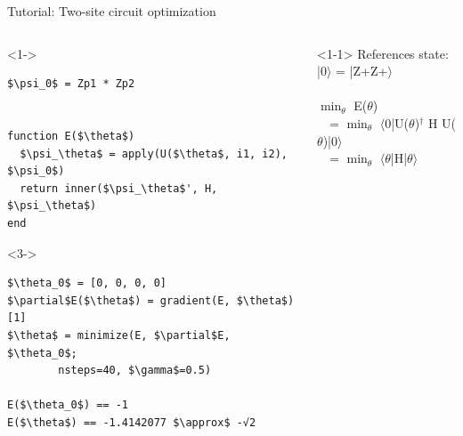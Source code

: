 \begin{frame}[fragile]{Tutorial: Two-site circuit optimization}

\begin{columns}

\begin{column}{5cm}

\begin{onlyenv}<1->
\begin{lstlisting}[language=JuliaLocal, style=julia, mathescape, basicstyle=\small]
$\psi_0$ = Zp1 * Zp2


function E($\theta$)
  $\psi_\theta$ = apply(U($\theta$, i1, i2), $\psi_0$)
  return inner($\psi_\theta$', H, $\psi_\theta$)
end
\end{lstlisting}
\end{onlyenv}

\begin{onlyenv}<3->
\begin{lstlisting}[language=JuliaLocal, style=julia, mathescape, basicstyle=\small]
$\theta_0$ = [0, 0, 0, 0]
$\partial$E($\theta$) = gradient(E, $\theta$)[1]
$\theta$ = minimize(E, $\partial$E, $\theta_0$;
        nsteps=40, $\gamma$=0.5)

E($\theta_0$) == -1
E($\theta$) == -1.4142077 $\approx$ -√2
\end{lstlisting}
\end{onlyenv}

\end{column}

\begin{column}{5cm}

\begin{onlyenv}<1-1>
References state: \\
|0$\rangle$ = |Z+Z+$\rangle$ \\
~\\
$\min_{\theta}$ E($\theta$)\\
\ \ = $\min_{\theta}$ $\langle$0|U($\theta$)$^\dagger$ H U($\theta$)|0$\rangle$ \\
\ \ = $\min_{\theta}$ $\langle\theta$|H|$\theta\rangle$ \\
\end{onlyenv}


\end{column}
\end{columns}
\end{frame}

